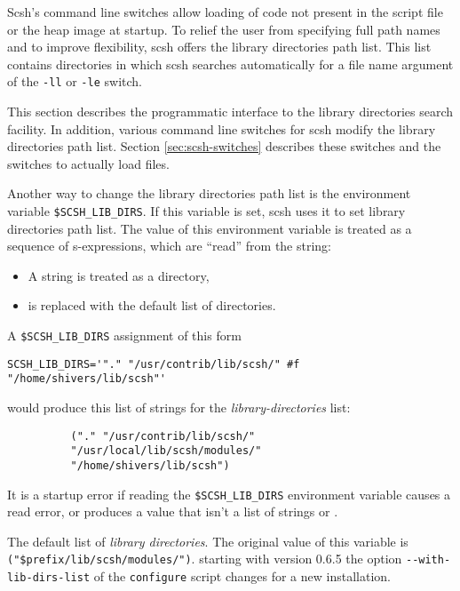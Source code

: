 Scsh's command line switches allow loading of code not present in the
script file or the heap image at startup. To relief the user from
specifying full path names and to improve flexibility, scsh offers the
library directories path list. This list contains directories in which
scsh searches automatically for a file name argument of the
\texttt{-ll} or \texttt{-le} switch.

This section describes the programmatic interface to the library
directories search facility. In addition, various command line
switches for scsh modify the library directories path list. Section
\ref{sec:scsh-switches} describes these switches and the switches to
actually load files.

Another way to change the library directories path list is the
environment variable \texttt{\$SCSH\_LIB\_DIRS}. If this variable is
set, scsh uses it to set library directories path list. The value of
this environment variable is treated as a sequence of s-expressions,
which are ``read'' from the string:
    
\begin{itemize}
\item A string is treated as a directory,
\item \sharpf{} is replaced with the default list of directories.
\end{itemize}

A \texttt{\$SCSH\_LIB\_DIRS} assignment of this form
\begin{small}
\begin{verbatim}
SCSH_LIB_DIRS='"." "/usr/contrib/lib/scsh/" #f "/home/shivers/lib/scsh"'
\end{verbatim}
\end{small}
would produce this list of strings for the
\textit{library-directories} list:
%
\begin{verbatim}
          ("." "/usr/contrib/lib/scsh/" 
          "/usr/local/lib/scsh/modules/" 
          "/home/shivers/lib/scsh")
\end{verbatim}
%
It is a startup error if reading the \texttt{\$SCSH\_LIB\_DIRS}
environment variable causes a read error, or produces a value that
isn't a list of strings or \sharpf.


\begin{desc}
  The default list of \textit{library directories}. The original value
of this variable is \verb+("$prefix/lib/scsh/modules/")+. %
starting with version 0.6.5 the option \verb+--with-lib-dirs-list+ of
the \texttt{configure} script changes for a new installation.
\end{desc}    

